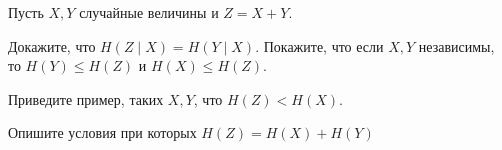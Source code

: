 Пусть $X, Y$ случайные величины и $Z = X + Y$.
\begin{enumcyr}
    \item Докажите, что $H(Z \mid X) = H(Y \mid X)$. Покажите, что если $X, Y$ независимы, то $H(Y) \leq
        H(Z)$ и $H(X) \leq H(Z)$.
    \item Приведите пример, таких $X, Y$, что $H(Z) < H(X)$.
    \item Опишите условия при которых $H(Z) = H(X) + H(Y)$
\end{enumcyr}